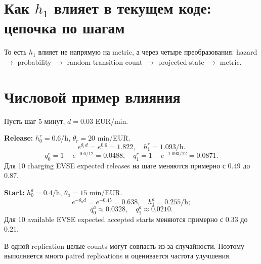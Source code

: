 \documentclass[11pt,a4paper]{article}
\begin{document}
\section{Как $h_1$ влияет в текущем коде: цепочка по шагам}
\begin{center}
\end{center}

То есть $h_1$ влияет не напрямую на metric, а через четыре преобразования: hazard $\to$ probability $\to$ random transition count $\to$ projected state $\to$ metric.

\section{Числовой пример влияния}
Пусть шаг 5 минут, $d=0.03$ EUR/min.

\textbf{Release:} $h_0^r=0.6$/h, $\theta_r=20$ min/EUR.
\[
e^{\theta_r d}=e^{0.6}=1.822,\quad h_1^r=1.093/\text{h}.
\]
\[
q_0^r=1-e^{-0.6/12}=0.0488,\quad q_1^r=1-e^{-1.093/12}=0.0871.
\]
Для 10 charging EVSE expected releases на шаге меняются примерно с 0.49 до 0.87.

\textbf{Start:} $h_0^a=0.4$/h, $\theta_a=15$ min/EUR.
\[
e^{-\theta_a d}=e^{-0.45}=0.638,\quad h_1^a=0.255/\text{h};
\]
\[
q_0^a\approx0.0328,\quad q_1^a\approx0.0210.
\]
Для 10 available EVSE expected accepted starts меняются примерно с 0.33 до 0.21.

В одной replication целые counts могут совпасть из-за случайности. Поэтому выполняется много paired replications и оценивается частота улучшения.
\end{document}
